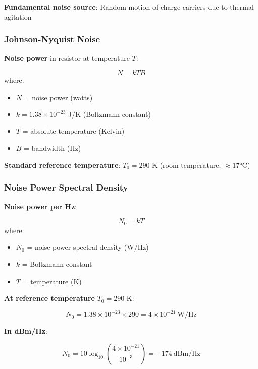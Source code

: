\textbf{Fundamental noise source}: Random motion of charge carriers due
to thermal agitation

\subsubsection{Johnson-Nyquist Noise}

\textbf{Noise power} in resistor at temperature $T$:

\begin{equation}
N = k T B
\end{equation}
where:
\begin{itemize}
\item $N$ = noise power (watts)
\item $k = 1.38 \times 10^{-23}$ J/K (Boltzmann constant)
\item $T$ = absolute temperature (Kelvin)
\item $B$ = bandwidth (Hz)
\end{itemize}

\textbf{Standard reference temperature}: $T_0 = 290$ K (room temperature, $\approx 17°$C)

\subsubsection{Noise Power Spectral Density}

\textbf{Noise power per Hz}:

\begin{equation}
N_0 = k T
\end{equation}
where:
\begin{itemize}
\item $N_0$ = noise power spectral density (W/Hz)
\item $k$ = Boltzmann constant
\item $T$ = temperature (K)
\end{itemize}

\textbf{At reference temperature} $T_0 = 290$ K:

\begin{equation}
N_0 = 1.38 \times 10^{-23} \times 290 = 4 \times 10^{-21}~\text{W/Hz}
\end{equation}

\textbf{In dBm/Hz}:

\begin{equation}
N_0 = 10\log_{10}\left(\frac{4 \times 10^{-21}}{10^{-3}}\right) = -174~\text{dBm/Hz}
\end{equation}

